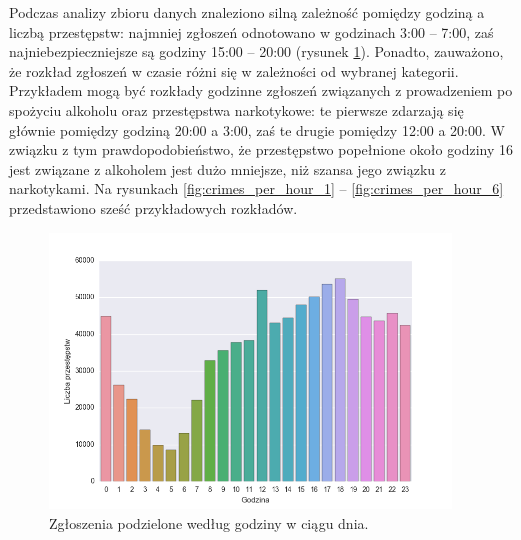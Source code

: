 \documentclass[11pt]{article} %
\begin{document}
Podczas analizy zbioru danych znaleziono silną zależność pomiędzy godziną a liczbą przestępstw: najmniej zgłoszeń odnotowano w godzinach 3:00 -- 7:00, zaś najniebezpieczniejsze są godziny 15:00 -- 20:00 (rysunek \ref{fig:hours}). Ponadto, zauważono, że rozkład zgłoszeń w czasie różni się w zależności od wybranej kategorii. Przykładem mogą być rozkłady godzinne zgłoszeń związanych z prowadzeniem po spożyciu alkoholu oraz przestępstwa narkotykowe: te pierwsze zdarzają się głównie pomiędzy godziną 20:00 a 3:00, zaś te drugie pomiędzy 12:00 a 20:00. W związku z tym prawdopodobieństwo, że przestępstwo popełnione około godziny 16 jest związane z alkoholem jest dużo mniejsze, niż szansa jego związku z narkotykami. Na rysunkach \ref{fig:crimes_per_hour_1} -- \ref{fig:crimes_per_hour_6} przedstawiono sześć przykładowych rozkładów. 

\begin{figure}[!h]
  \centering
    \includegraphics[width=0.95\textwidth]{images/hours}
  \caption{Zgłoszenia podzielone według godziny w ciągu dnia.} \label{fig:hours}
\end{figure}
\end{document}
